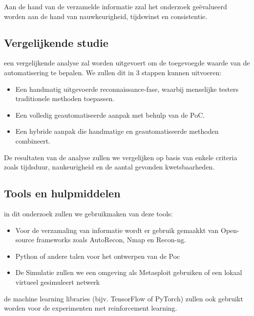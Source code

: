 Aan de hand van de verzamelde informatie zzal het onderzoek geëvalueerd worden aan de hand van nauwkeurigheid, tijdswinst en consistentie.

\subsection{Vergelijkende studie}

een vergelijkende analyse zal worden uitgevoert om de toegevoegde waarde van de automatisering te bepalen. We zullen dit in 3
stappen kunnen uitvoeren:

\begin{itemize}
    \item Een handmatig uitgevoerde reconnaissance-fase, waarbij menselijke testers traditionele methoden toepassen.
    \item Een volledig geautomatiseerde aanpak met behulp van de PoC.
    \item Een hybride aanpak die handmatige en geautomatiseerde methoden combineert.
\end{itemize}

De resultaten van de analyse zullen we vergelijken op basis van enkele criteria zoals tijdsduur, naukeurigheid en de aantal gevonden kwetsbaarheden.

\subsection{Tools en hulpmiddelen}

in dit onderzoek zullen we gebruikmaken van deze tools: 

\begin{itemize}
    \item Voor de verzamaling van informatie wordt er gebruik gemaakkt van Open-source frameworks zoals AutoRecon, Nmap en Recon-ng.
    \item Python of andere talen voor het ontwerpen van de Poc
    \item De Simulatie zullen we een omgeving als Metasploit gebruiken of een lokaal virtueel gesimuleert netwerk
\end{itemize}

de machine learning libraries (bijv. TensorFlow of PyTorch) zullen ook gebruikt worden voor de experimenten met reinforcement learning.


